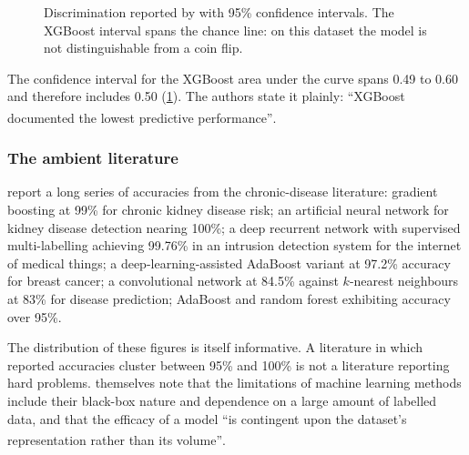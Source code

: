 \documentclass[12pt,a4paper,oneside]{report}
\newcommand{\bq}[1]{``#1''\textsuperscript{\dag}}
\begin{document}
\begin{figure}[htbp]
\centering
{}
\caption{Discrimination reported by \textcite{mendoza2025} with 95\% confidence intervals. The XGBoost interval spans the chance line: on this dataset the model is not distinguishable from a coin flip.}\label{fig:mendoza-auc}
\end{figure}

The confidence interval for the XGBoost area under the curve spans 0.49 to 0.60 and therefore includes 0.50 (\cref{fig:mendoza-auc}). The authors state it plainly: \bq{XGBoost documented the lowest predictive performance}.

\subsubsection{The ambient literature}

\Textcite{liu2025review} report a long series of accuracies from the chronic-disease literature: gradient boosting at 99\% for chronic kidney disease risk; an artificial neural network for kidney disease detection nearing 100\%; a deep recurrent network with supervised multi-labelling achieving 99.76\% in an intrusion detection system for the internet of medical things; a deep-learning-assisted AdaBoost variant at 97.2\% accuracy for breast cancer; a convolutional network at 84.5\% against $k$-nearest neighbours at 83\% for disease prediction; AdaBoost and random forest exhibiting accuracy over 95\%.

The distribution of these figures is itself informative. A literature in which reported accuracies cluster between 95\% and 100\% is not a literature reporting hard problems. \Textcite{liu2025review} themselves note that the limitations of machine learning methods include their black-box nature and dependence on a large amount of labelled data, and that the efficacy of a model \bq{is contingent upon the dataset's representation rather than its volume}.
\end{document}

